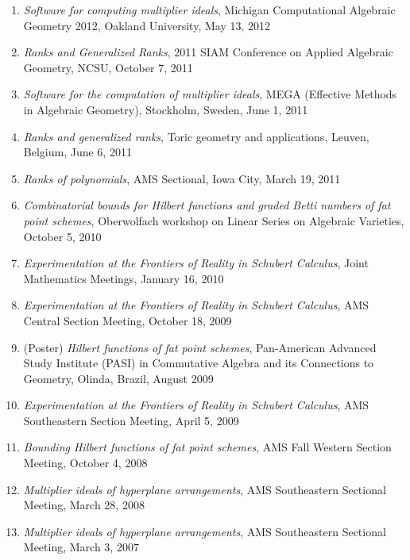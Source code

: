 \documentclass[12pt]{article}
\begin{document}
\begin{enumerate}
\item \textit{Software for computing multiplier ideals},
Michigan Computational Algebraic Geometry 2012,
Oakland University, May 13, 2012

\item \textit{Ranks and Generalized Ranks},
2011 SIAM Conference on Applied Algebraic Geometry,
NCSU, October 7, 2011

\item \textit{Software for the computation of multiplier ideals},
MEGA (Effective Methods in Algebraic Geometry), Stockholm, Sweden, June 1, 2011

\item \textit{Ranks and generalized ranks},
Toric geometry and applications, Leuven, Belgium, June 6, 2011

\item \textit{Ranks of polynomials}, AMS Sectional, Iowa City, March 19, 2011

\item \textit{Combinatorial bounds for Hilbert functions and graded Betti numbers of fat point schemes},
Oberwolfach workshop on Linear Series on Algebraic Varieties, October 5, 2010

\item \textit{Experimentation at the Frontiers of Reality in Schubert Calculus},
Joint Mathematics Meetings, January 16, 2010

\item \textit{Experimentation at the Frontiers of Reality in Schubert Calculus},
AMS Central Section Meeting, October 18, 2009

\item (Poster) \textit{Hilbert functions of fat point schemes},
Pan-American Advanced Study Institute (PASI) 
in 
Commutative Algebra and its Connections to Geometry,
Olinda, Brazil, August 2009

\item \textit{Experimentation at the Frontiers of Reality in Schubert Calculus},
AMS Southeastern Section Meeting, April 5, 2009

\item \textit{Bounding Hilbert functions of fat point schemes},
AMS Fall Western Section Meeting, October 4, 2008

\item \textit{Multiplier ideals of hyperplane arrangements},
AMS Southeastern Sectional Meeting, March 28, 2008

\item \textit{Multiplier ideals of hyperplane arrangements},
AMS Southeastern Sectional Meeting, March 3, 2007


\end{enumerate}
\end{document}
